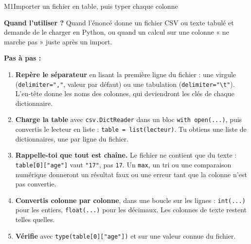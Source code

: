 \begin{fichemethode}{M1}{Importer un fichier en table, puis typer chaque colonne}

\textbf{Quand l'utiliser ?} Quand l'énoncé donne un fichier CSV ou texte tabulé et demande de
le charger en Python, ou quand un calcul sur une colonne « ne marche pas » juste après un
import.

\textbf{Pas à pas :}
\begin{enumerate}
  \item \textbf{Repère le séparateur} en lisant la première ligne du fichier : une virgule
        (\lstinline{delimiter=","}, valeur par défaut) ou une tabulation
        (\lstinline{delimiter="\t"}). L'en-tête donne les noms des colonnes, qui deviendront
        les clés de chaque dictionnaire.
  \item \textbf{Charge la table} avec \lstinline{csv.DictReader} dans un bloc
        \lstinline{with open(...)}, puis convertis le lecteur en liste :
        \lstinline{table = list(lecteur)}. Tu obtiens une liste de dictionnaires, une par
        ligne du fichier.
  \item \textbf{Rappelle-toi que tout est chaîne.} Le fichier ne contient que du texte :
        \lstinline{table[0]["age"]} vaut \lstinline{"17"}, pas \lstinline{17}. Un
        \lstinline{max}, un tri ou une comparaison numérique donneront un résultat faux ou une
        erreur tant que la colonne n'est pas convertie.
  \item \textbf{Convertis colonne par colonne}, dans une boucle sur les lignes :
        \lstinline{int(...)} pour les entiers, \lstinline{float(...)} pour les décimaux. Les
        colonnes de texte restent telles quelles.
  \item \textbf{Vérifie} avec \lstinline{type(table[0]["age"])} et sur une valeur connue du
        fichier.
\end{enumerate}


\end{fichemethode}

